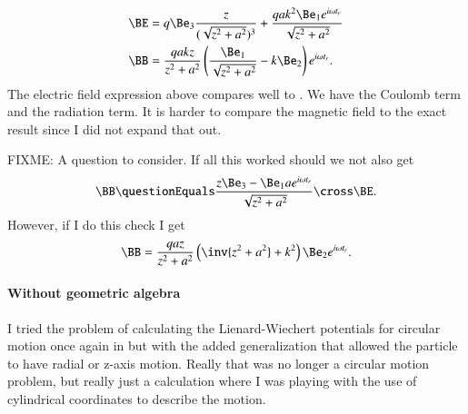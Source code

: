 {\begin{equation}
\begin{aligned}
\BE &=
q \Be_3 \frac{z}{(\sqrt{z^2 + a^2})^3}
+
\frac{q a k^2 \Be_1 e^{i \omega t_r} }{\sqrt{z^2 + a^2}} \\
\BB
&= \frac{q a k z}{ z^2 + a^2} \left( \frac{\Be_1}{\sqrt{z^2 + a^2}} - k \Be_2 \right) e^{i \omega t_r}.
\end{aligned}
\end{equation}
%
The electric field expression above compares well to .  We have the Coulomb term and the radiation term.  It is harder to compare the magnetic field to the exact result  since I did not expand that out.

FIXME: A question to consider.  If all this worked should we not also get
%
\begin{equation}\label{eqn:relativisticElectrodynamicsExamReflection:270}
\BB
\questionEquals
\frac{z \Be_3 - \Be_1 a e^{i \omega t_r}}{\sqrt{z^2 + a^2}} \cross \BE.
\end{equation}
%
However, if I do this check I get
%
\begin{equation}\label{eqn:relativisticElectrodynamicsExamReflection:290}
\BB
=
\frac{q a z}{z^2 + a^2} \left( \inv{z^2 + a^2} + k^2 \right) \Be_2 e^{i \omega t_r}.
\end{equation}
%
%
\paragraph{Without geometric algebra}
%
I tried the problem of calculating the Lienard-Wiechert potentials for circular motion once again in \citep{gabookII:matrixVectorPotentials} but with the added generalization that allowed the particle to have radial or z-axis motion.  Really that was no longer a circular motion problem, but really just a calculation where I was playing with the use of cylindrical coordinates to describe the motion.

}
